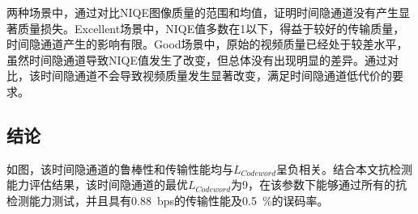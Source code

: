 两种场景中，通过对比NIQE图像质量的范围和均值，证明时间隐通道没有产生显著质量损失。Excellent场景中，NIQE值多数在1以下，得益于较好的传输质量，时间隐通道产生的影响有限。Good场景中，原始的视频质量已经处于较差水平，虽然时间隐通道导致NIQE值发生了改变，但总体没有出现明显的差异。通过对比，该时间隐通道不会导致视频质量发生显著改变，满足时间隐通道低代价的要求。

\subsection{结论}
\label{chap:zigzag:results:conclusion}


如图，该时间隐通道的鲁棒性和传输性能均与$L_{Codeword}$呈负相关。结合本文抗检测能力评估结果，该时间隐通道的最优$L_{Codeword}$为9，在该参数下能够通过所有的抗检测能力测试，并且具有{0.88\ bps}的传输性能及{0.5\ \%}的误码率。

